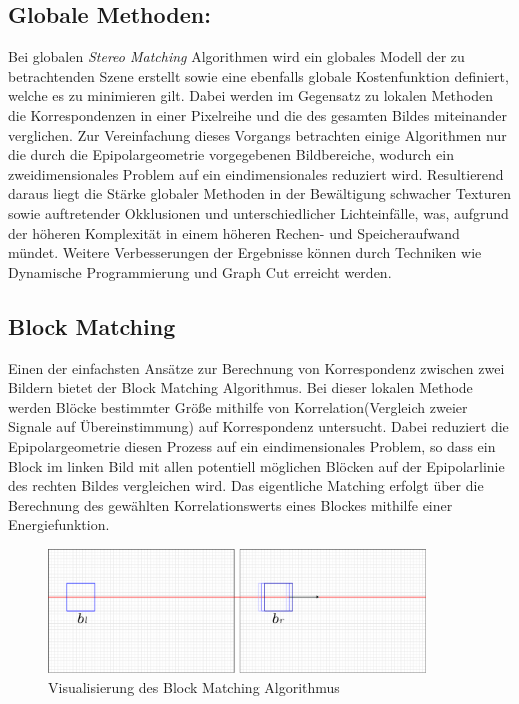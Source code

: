 \subsection{Globale Methoden:}
\label{subsec:global_methods}
Bei globalen \emph{Stereo Matching} Algorithmen wird ein globales Modell der zu betrachtenden Szene erstellt sowie eine ebenfalls globale Kostenfunktion definiert, welche es zu minimieren gilt. Dabei werden im Gegensatz zu lokalen Methoden die Korrespondenzen in einer Pixelreihe und die des gesamten Bildes miteinander verglichen. Zur Vereinfachung dieses Vorgangs betrachten einige Algorithmen nur die durch die Epipolargeometrie vorgegebenen Bildbereiche, wodurch ein zweidimensionales Problem auf ein eindimensionales reduziert wird. Resultierend daraus liegt die Stärke globaler Methoden in der Bewältigung schwacher Texturen sowie auftretender Okklusionen und unterschiedlicher Lichteinfälle, was, aufgrund der höheren Komplexität in einem höheren Rechen- und Speicheraufwand mündet. Weitere Verbesserungen der Ergebnisse können durch Techniken wie Dynamische Programmierung und Graph Cut erreicht werden.

\subsection{Block Matching}
\label{subsec:stereo_matching_bm}
Einen der einfachsten Ansätze zur Berechnung von Korrespondenz zwischen zwei Bildern bietet der Block Matching Algorithmus. Bei dieser lokalen Methode werden Blöcke bestimmter Größe mithilfe von Korrelation(Vergleich zweier Signale auf Übereinstimmung) auf Korrespondenz untersucht. Dabei reduziert die Epipolargeometrie diesen Prozess auf ein eindimensionales Problem, so dass ein Block im linken Bild mit allen potentiell möglichen Blöcken auf der Epipolarlinie des rechten Bildes vergleichen wird. Das eigentliche Matching erfolgt über die Berechnung des gewählten Korrelationswerts eines Blockes mithilfe einer Energiefunktion.

\begin{figure}[h]
	\begin{center}
		\includegraphics[width=10cm]{img/block_matching.pdf}
	\end{center}
	\caption{Visualisierung des Block Matching Algorithmus}
	\label{fig:block_matching}
\end{figure}

